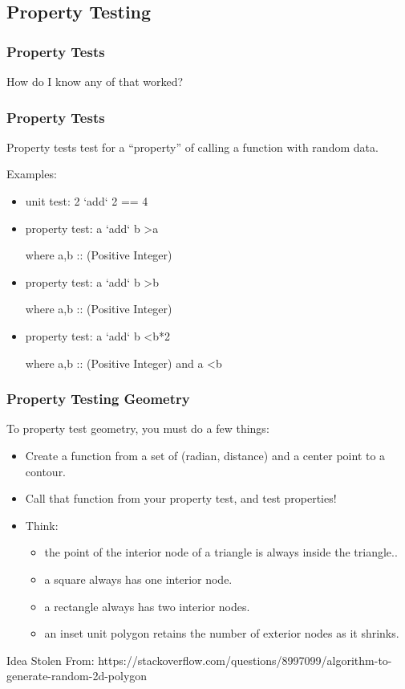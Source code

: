 \documentclass[hyperref={pdfpagemode=FullScreen},aspectratio=169]{beamer}
\begin{document}
\subsection{Property Testing}

\begin{frame}
  \frametitle{Property Tests}
  \Huge{\centerline{How do I know any of that worked?}}
\end{frame}

\begin{frame}
  \frametitle{Property Tests}
  Property tests test for a ``property'' of calling a function with random data.
  \par Examples:
  \normalsize
  \begin{itemize}
    \item unit test: 2 `add` 2 == 4
    \item property test: a `add` b \textgreater a \par where a,b :: (Positive Integer)
    \item property test: a `add` b \textgreater b \par where a,b :: (Positive Integer)
    \item property test: a `add` b \textless b*2 \par where a,b :: (Positive Integer) and a \textless b
  \end{itemize}
\end{frame}

\begin{frame}
  \frametitle{Property Testing Geometry}
  \large To property test geometry, you must do a few things:
  \begin{itemize}
  \item Create a function from a set of (radian, distance) and a center point to a contour.
  \item Call that function from your property test, and test properties!
  \item Think:
    \begin{itemize}
    \item the point of the interior node of a triangle is always inside the triangle..
    \item a square always has one interior node.
    \item a rectangle always has two interior nodes.
    \item an inset unit polygon retains the number of exterior nodes as it shrinks.
    \end{itemize}
  \end{itemize}
  \begin{block}{Idea Stolen From:}
    https://stackoverflow.com/questions/8997099/algorithm-to-generate-random-2d-polygon
  \end{block}
\end{frame}
\end{document}
